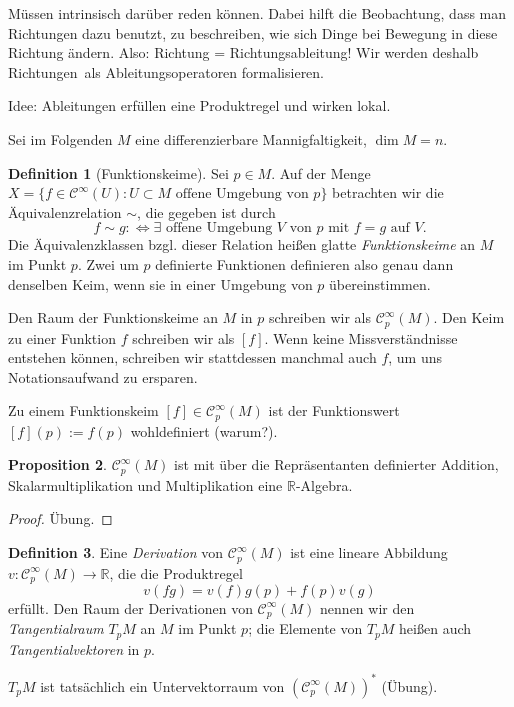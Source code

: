 \documentclass[a4paper]{scrreprt}
\numberwithin{equation}{chapter}
\newcommand{\diff}{:\Longleftrightarrow}
\newcommand{\sC}{\mathcal{C}^{\infty}}
\theoremstyle{definition}
\newtheorem{defn}{Definition}[section]
\newtheorem{prop}[defn]{Proposition}
\newcommand{\bewUeb}{\begin{proof}Übung.\end{proof}}
\begin{document}
Müssen intrinsisch darüber reden können. Dabei hilft die Beobachtung, dass man Richtungen dazu benutzt, zu beschreiben, wie sich Dinge bei Bewegung in diese Richtung ändern. Also: Richtung = Richtungsableitung!  Wir werden deshalb \glqq Richtungen\grqq\ als Ableitungsoperatoren formalisieren.

Idee: Ableitungen erfüllen eine Produktregel und wirken \glqq lokal\grqq.

Sei im Folgenden $M$ eine differenzierbare Mannigfaltigkeit, $\dim M = n$.

\begin{defn}[Funktionskeime]
	Sei $p \in M$. Auf der Menge $X = \{f \in \sC(U) : U \subset M \text{ offene Umgebung von } p\}$ betrachten wir die Äquivalenzrelation $\sim$, die gegeben ist durch
	\[f \sim g \diff \exists \text{ offene Umgebung } V \text{ von } p \text{ mit } f = g \text{ auf } V.\]
	Die Äquivalenzklassen bzgl. dieser Relation heißen glatte \emph{Funktionskeime} an $M$ im Punkt $p$. Zwei um $p$ definierte Funktionen definieren also genau dann denselben Keim, wenn sie in einer Umgebung von $p$ übereinstimmen.

	Den Raum der Funktionskeime an $M$ in $p$ schreiben wir als $\sC_p(M)$. Den Keim zu einer Funktion $f$ schreiben wir als $[f]$. Wenn keine Missverständnisse entstehen können, schreiben wir stattdessen manchmal auch $f$, um uns Notationsaufwand zu ersparen.
\end{defn}

Zu einem Funktionskeim $[f] \in \sC_p(M)$ ist der Funktionswert $[f](p) := f(p)$ wohldefiniert (warum?).

\begin{prop}
	$\sC_p(M)$ ist mit über die Repräsentanten definierter Addition, Skalarmultiplikation und Multiplikation eine $\mathbb R$-Algebra. \bewUeb
\end{prop}

\begin{defn}
	Eine \emph{Derivation} von $\sC_p(M)$ ist eine lineare Abbildung $v\colon \sC_p(M) \to \mathbb R$, die die \glqq Produktregel\grqq\ \[v(fg) = v(f) g(p) + f(p) v(g)\] erfüllt. Den Raum der Derivationen von $\sC_p(M)$ nennen wir den \emph{Tangentialraum} $T_pM$ an $M$ im Punkt $p$; die Elemente von $T_pM$ heißen auch \emph{Tangentialvektoren} in $p$.
\end{defn}

$T_pM$ ist tatsächlich ein Untervektorraum von $(\sC_p(M))^*$ (Übung).
\end{document}
